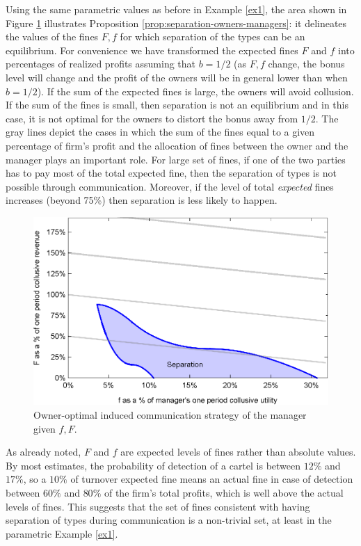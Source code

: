 \documentclass[]{article}
\begin{document}
Using the same parametric values as before in Example \ref{ex1}, the area shown in Figure \ref{fig:fines} illustrates Proposition \ref{prop:separation-owners-managers}: it delineates the values of the fines $F,f$ for which separation of the types can be an equilibrium. For convenience we have transformed the expected fines $F$ and $f$ into percentages of realized profits assuming that $b=1/2$ (as $F,f$ change, the bonus level will change and the profit of the owners will be in general lower than when $b=1/2$). If the sum of the expected fines is large, the owners will avoid collusion. If the sum of the fines is small, then separation is not an equilibrium and in this case, it is not optimal for the owners to distort the bonus away from $1/2$. The gray lines depict the cases in which the sum of the fines equal to a given percentage of firm's profit and the allocation of fines between the owner and the manager plays an important role. For large set of fines, if one of the two parties has to pay most of the total expected fine, then the separation of types is not possible through communication. Moreover, if the level of total \textit{expected} fines increases (beyond 75\%) then separation is less likely to happen.
\begin{figure}[ht]
\centering
\includegraphics[scale=0.8]{Plots/Bertrand_sep_f_F.eps}
\caption{Owner-optimal induced communication strategy of the manager given $f,F$.}\label{fig:fines}
\end{figure}
%
As already noted, $F$ and $f$ are expected levels of fines rather than absolute values. By most estimates, the probability of detection of a cartel is between $12\%$ and $17\%$, so a $10\%$ of turnover expected fine means an actual fine in case of detection between $60\%$ and $80\%$ of the firm's total profits, which is well above the actual levels of fines. This suggests that the set of fines consistent with having separation of types during communication is a non-trivial set, at least in the parametric Example \ref{ex1}. 
\end{document}
